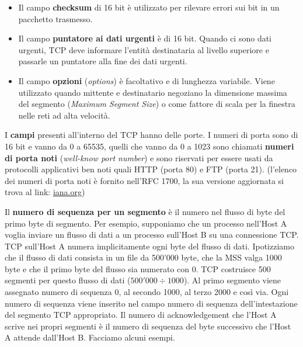 \documentclass[a4paper]{article}
\begin{document}
\begin{itemize}
		\item Il campo \textbf{checksum} di 16 bit è utilizzato per rilevare errori sui bit in un pacchetto trasmesso.
		
		\item Il campo \textbf{puntatore ai dati urgenti} è di 16 bit. Quando ci sono dati urgenti, TCP deve informare l’entità destinataria al livello superiore e passarle un puntatore alla fine dei dati urgenti.
		
		\item Il campo \textbf{opzioni} (\emph{options}) è facoltativo e di lunghezza variabile. Viene utilizzato quando mittente e destinatario negoziano la dimensione massima del segmento (\emph{Maximum Segment Size}) o come fattore di scala per la finestra nelle reti ad alta velocità.
	\end{itemize}
	\newline
	
	\noindent
	I \textbf{campi} presenti all’interno del TCP hanno delle porte. I numeri di porta sono di 16 bit e vanno da 0 a 65535, quelli che vanno da 0 a 1023 sono chiamati \textbf{numeri di porta noti} (\emph{well-know port number}) e sono riservati per essere usati da protocolli applicativi ben noti quali HTTP (porta 80) e FTP (porta 21). (l’elenco dei numeri di porta noti è fornito nell’RFC 1700, la sua versione aggiornata si trova al link: \href{http://www.iana.org}{iana.org})
	
	\newpage
	
	\noindent
	Il \textbf{numero di sequenza per un segmento} è il numero nel flusso di byte del primo byte di segmento. Per esempio, supponiamo che un processo nell’Host A voglia inviare un flusso di dati a un processo sull’Host B su una connessione TCP. TCP sull’Host A numera implicitamente ogni byte del flusso di dati. Ipotizziamo che il flusso di dati consista in un file da 500'000 byte, che la MSS valga 1000 byte e che il primo byte del flusso sia numerato con 0. TCP costruisce 500 segmenti per questo flusso di dati ($500'000 \div 1000$). Al primo segmento viene assegnato numero di sequenza 0, al secondo 1000, al terzo 2000 e così via. Ogni numero di sequenza viene inserito nel campo numero di sequenza dell’intestazione del segmento TCP appropriato. Il numero di acknowledgement che l’Host A scrive nei propri segmenti è il numero di sequenza del byte successivo che l’Host A attende dall’Host B. Facciamo alcuni esempi.\newline
	
\end{document}
